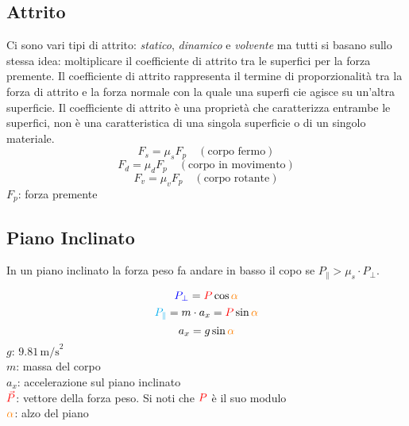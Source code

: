 \subsection{Attrito}
Ci sono vari tipi di attrito: \emph{statico}, \emph{dinamico} e \emph{volvente} ma tutti si basano
sullo stessa idea: moltiplicare il coefficiente di attrito tra le superfici per la forza premente.
Il coefficiente di attrito rappresenta il termine di proporzionalità tra la forza di attrito e la 
forza normale con la quale una superfi cie agisce su un’altra superficie. Il coefficiente di 
attrito è una proprietà che caratterizza entrambe le superfici, non è una caratteristica di una 
singola superficie o di un singolo materiale.
\begin{equation*}
  F_s = \mu_sF_p\quad (\text{corpo fermo})
\end{equation*}
\begin{equation*}
  F_d = \mu_dF_p\quad (\text{corpo in movimento})
\end{equation*}
\begin{equation*}
  F_v = \mu_vF_p\quad (\text{corpo rotante})
\end{equation*}
$F_p$: forza premente

\subsection{Piano Inclinato}
In un piano inclinato la forza peso fa andare in basso il copo se $P_\| > \mu_s\cdot P_\perp$.
\begin{center}
\end{center}
\begin{equation*}
\mathcolor{blue}{P_\perp} = \mathcolor{red}{P}\cos\mathcolor{orange}{\alpha}
\end{equation*}
\begin{equation*}
\mathcolor{cyan}{P_\Vert} = m\cdot a_x = \mathcolor{red}{P}\sin\mathcolor{orange}{\alpha}
\end{equation*}
\begin{equation*}
a_x = g\sin\mathcolor{orange}{\alpha}
\end{equation*}
\hyperref[tab:g]{$g$}: $9.81\,\text{m/s}^2$\\
$m$: massa del corpo\\
$a_x$: accelerazione sul piano inclinato\\
$\mathcolor{red}{\vec{P}}$: vettore della forza peso. Si noti che $\mathcolor{red}{P}$ è il suo 
modulo\\
$\mathcolor{orange}{\alpha}$: alzo del piano

